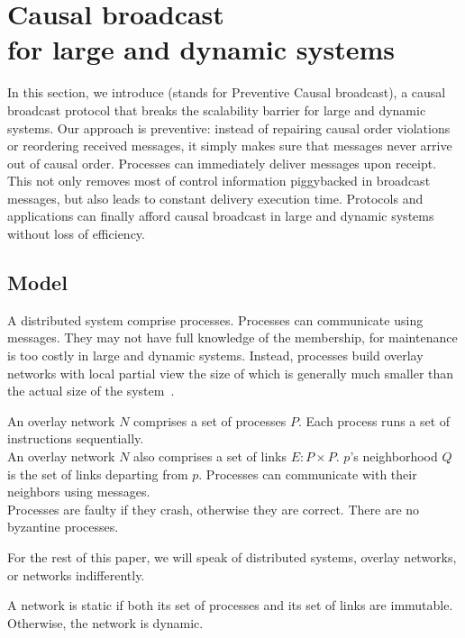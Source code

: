 
\section{Causal broadcast\\for large and dynamic systems}
\label{sec:proposal}

In this section, we introduce \CBROADCAST (stands for Preventive Causal
broadcast), a causal broadcast protocol that breaks the scalability barrier for
large and dynamic systems.  Our approach is preventive: instead of repairing
causal order violations or reordering received messages, it simply makes sure
that messages never arrive out of causal order. Processes can immediately
deliver messages upon receipt. This not only removes most of control information
piggybacked in broadcast messages, but also leads to constant delivery execution
time. Protocols and applications can finally afford causal broadcast in large
and dynamic systems without loss of efficiency.

\subsection{Model}

A distributed system comprise processes. Processes can communicate using
messages. They may not have full knowledge of the membership, for maintenance is
too costly in large and dynamic systems. Instead, processes build overlay
networks with local partial view the size of which is generally much smaller
than the actual size of the
system~\cite{bertier-d2ht,jelasity2007gossip,jelasity2009tman}.

\begin{definition}
  An overlay network $N$ comprises a set of processes $P$. Each process runs a
  set of instructions sequentially. \\
  An overlay network $N$ also comprises a set of links $E: P \times P$. $p$'s
  neighborhood $Q$ is the set of links departing from $p$. Processes can
  communicate with their neighbors using messages. \\
  Processes are faulty if they crash, otherwise they are correct. %
  There are no byzantine processes.
\end{definition}

For the rest of this paper, we will speak of distributed systems, overlay
networks, or networks indifferently.

\begin{definition}
  A network is static if both its set of processes and its set of links are
  immutable. Otherwise, the network is dynamic.
\end{definition}

